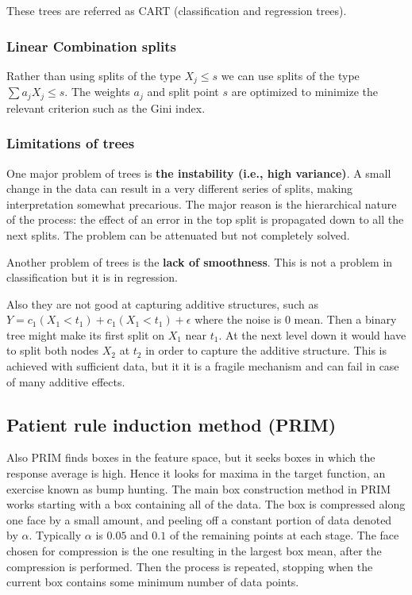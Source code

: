 These trees are referred as CART (classification and regression trees).
\subsubsection{Linear Combination splits}
Rather than using splits of the type $X_j\le s$ we can use splits of the type $\sum a_j X_j \le s$. The weights $a_j$ and split point $s$ are optimized to minimize the relevant criterion  such as the Gini index.

\subsubsection{Limitations of trees}
One major problem of trees is \textbf{the instability (i.e., high variance)}. A small change in the data can result in a very different series of splits, making interpretation somewhat precarious. The major reason is the hierarchical nature of the process: the effect of an error in the top split is propagated down to all the next splits. The problem can be attenuated but not completely solved.

Another problem of trees is the \textbf{lack of smoothness}. This is not a problem in classification but it is in regression.

Also they are not good at capturing additive structures, such as $Y = c_1 (X_1 < t_1) + c_1 (X_1 < t_1)+\epsilon$ where the noise is $0$ mean. Then a binary tree might make its first split on $X_1$ near $t_1$. At the next level down it would have to split both nodes $X_2$ at $t_2$ in order to capture the additive structure. This is achieved with sufficient data, but it it is a fragile mechanism and can fail in case of many additive effects.
\subsection{Patient rule induction method (PRIM)}
Also PRIM finds boxes in the feature space, but it seeks boxes in which the response average is high. Hence it looks for maxima in the target function, an exercise known as bump hunting. The main box construction method in PRIM works starting with a box containing all of the data. The box is compressed along one face by a small amount, and peeling off a constant portion of data denoted by $\alpha$. Typically $\alpha$ is $0.05$ and $0.1$ of the remaining points at each stage. The face chosen for compression is the one resulting in the largest box mean, after the compression is performed. Then the process is repeated, stopping when the current box contains some minimum number of data points.

